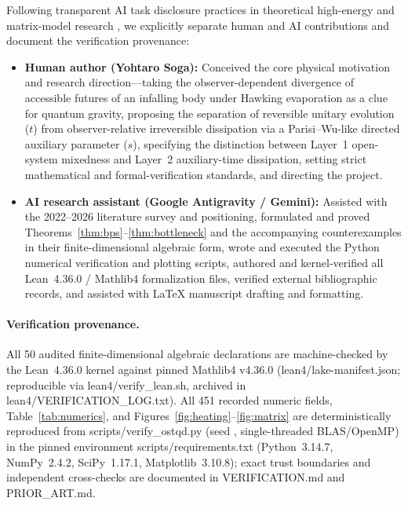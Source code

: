 \documentclass[11pt,a4paper]{article}
\theoremstyle{definition}
\theoremstyle{remark}
\newcommand{\1}{\mathbf{1}}
\newcommand{\code}[1]{{\footnotesize\ttfamily #1}}
\begin{document}
Following transparent AI task disclosure practices in theoretical high-energy and matrix-model research \cite{Michel2026}, we explicitly separate human and AI contributions and document the verification provenance:
\begin{itemize}
  \item \textbf{Human author (Yohtaro Soga):} Conceived the core physical motivation and research direction---taking the observer-dependent divergence of accessible futures of an infalling body under Hawking evaporation as a clue for quantum gravity, proposing the separation of reversible unitary evolution ($t$) from observer-relative irreversible dissipation via a Parisi--Wu-like directed auxiliary parameter ($s$), specifying the distinction between Layer~1 open-system mixedness and Layer~2 auxiliary-time dissipation, setting strict mathematical and formal-verification standards, and directing the project.
  \item \textbf{AI research assistant (Google Antigravity / Gemini):} Assisted with the 2022--2026 literature survey and positioning, formulated and proved Theorems~\ref{thm:bps}--\ref{thm:bottleneck} and the accompanying counterexamples in their finite-dimensional algebraic form, wrote and executed the Python numerical verification and plotting scripts, authored and kernel-verified all Lean~4.36.0 / Mathlib4 formalization files, verified external bibliographic records, and assisted with LaTeX manuscript drafting and formatting.
\end{itemize}
\paragraph{Verification provenance.}
All 50 audited finite-dimensional algebraic declarations are machine-checked by the Lean~4.36.0 kernel against pinned Mathlib4 \code{v4.36.0} (\code{lean4/lake-manifest.json}; reproducible via \code{lean4/verify\_lean.sh}, archived in \code{lean4/VERIFICATION\_LOG.txt}). All 451 recorded numeric fields, Table~\ref{tab:numerics}, and Figures~\ref{fig:heating}--\ref{fig:matrix} are deterministically reproduced from \code{scripts/verify\_ostqd.py} (seed \code{20261126}, single-threaded BLAS/OpenMP) in the pinned environment \code{scripts/requirements.txt} (Python~3.14.7, NumPy~2.4.2, SciPy~1.17.1, Matplotlib~3.10.8); exact trust boundaries and independent cross-checks are documented in \code{VERIFICATION.md} and \code{PRIOR\_ART.md}.



\end{document}

